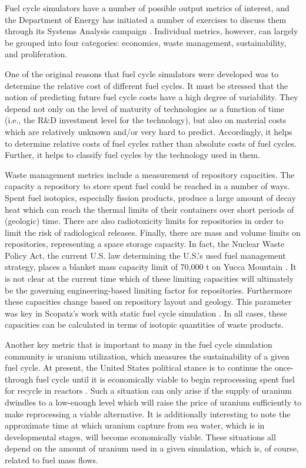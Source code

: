 Fuel cycle simulators have a number of possible output metrics of interest, and
the Department of Energy has initiated a number of exercises to discuss them
through its Systems Analysis campaign \cite{nutt_proposed_2012,
taiwo_summary_2012}. Individual metrics, however, can largely be grouped into
four categories: economics, waste management, sustainability, and proliferation.

One of the original reasons that fuel cycle simulators were developed was to
determine the relative cost of different fuel cycles. It must be stressed that
the notion of predicting future fuel cycle costs have a high degree of
variability. They depend not only on the level of maturity of technologies as a
function of time (i.e., the R\&D investment level for the technology), but also
on material costs which are relatively unknown and/or very hard to
predict. Accordingly, it helps to determine relative costs of fuel cycles rather
than absolute costs of fuel cycles. Further, it helps to classify fuel cycles by
the technology used in them.

Waste management metrics include a measurement of repository capacities. The
capacity a repository to store spent fuel could be reached in a number of
ways. Spent fuel isotopics, especially fission products, produce a large amount
of decay heat which can reach the thermal limits of their containers over short
periods of (geologic) time. There are also radiotoxicity limits for repositories
in order to limit the risk of radiological releases. Finally, there are mass and
volume limits on repositories, representing a space storage capacity. In fact,
the Nuclear Waste Policy Act, the current U.S. law determining the U.S.'s used
fuel management strategy, places a blanket mass capacity limit of 70,000 t on
Yucca Mountain \cite{us_nuclear_1982}.  It is not clear at the current time
which of these limiting capacities will ultimately be the governing
engineering-based limiting factor for repositories. Furthermore these capacities
change based on repository layout and geology.  This parameter was key in
Scopatz's work with static fuel cycle simulation
\cite{scopatz_essential_2011}. In all cases, these capacities can be calculated
in terms of isotopic quantities of waste products. 

Another key metric that is important to many in the fuel cycle simulation
community is uranium utilization, which measures the sustainability of a given
fuel cycle. At present, the United States political stance is to continue the
once-through fuel cycle until it is economically viable to begin reprocessing
spent fuel for recycle in reactors \cite{hamilton_blue_2012}. Such a situation
can only arise if the supply of uranium dwindles to a low-enough level which
will raise the price of uranium sufficiently to make reprocessing a viable
alternative. It is additionally interesting to note the approximate time at
which uranium capture from sea water, which is in developmental stages, will
become economically viable. These situations all depend on the amount of uranium
used in a given simulation, which is, of course, related to fuel mass flows.

